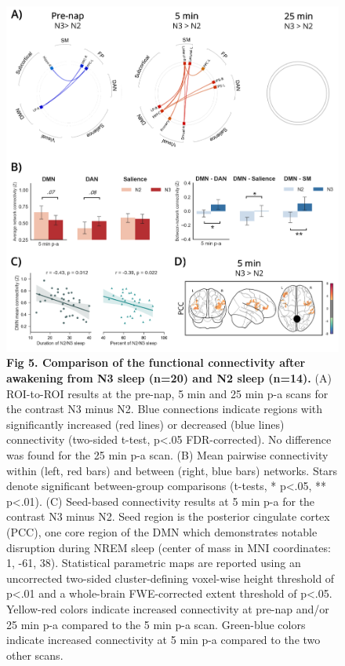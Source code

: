 \begin{figure}[!htbp]
	\includegraphics[width=\textwidth]{Fig/Results/Inertia/Inertia/Fig5_N2vsN3.png}
	\caption*{\textbf{Fig 5. Comparison of the functional connectivity after awakening from N3 sleep (n=20) and N2 sleep (n=14).} (A) ROI-to-ROI results at the pre-nap, 5 min and 25 min p-a scans for the contrast N3 minus N2. Blue connections indicate regions with significantly increased (red lines) or decreased (blue lines) connectivity (two-sided t-test, p<.05 FDR-corrected). No difference was found for the 25 min p-a scan. (B) Mean pairwise connectivity within (left, red bars) and between (right, blue bars) networks. Stars denote significant between-group comparisons (t-tests, * p<.05, ** p<.01). (C) Seed-based connectivity results at 5 min p-a for the contrast N3 minus N2. Seed region is the posterior cingulate cortex (PCC), one core region of the DMN which demonstrates notable disruption during NREM sleep (center of mass in MNI coordinates: 1, -61, 38). Statistical parametric maps are reported using an uncorrected two-sided cluster-defining voxel-wise height threshold of p<.01 and a whole-brain FWE-corrected extent threshold of p<.05. Yellow-red colors indicate increased connectivity at pre-nap and/or 25 min p-a compared to the 5 min p-a scan. Green-blue colors indicate increased connectivity at 5 min p-a compared to the two other scans.}
\end{figure}

